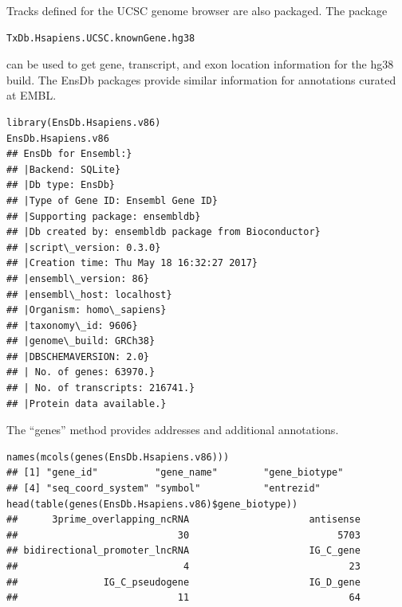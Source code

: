 Tracks defined for the UCSC genome browser are also
packaged. The package 
\begin{verbatim}
TxDb.Hsapiens.UCSC.knownGene.hg38 
\end{verbatim} 
can be
used to get gene, transcript, and exon location information
for the hg38 build. The EnsDb packages provide similar
information for annotations curated at EMBL.


\begin{shaded}
\begin{verbatim}
library(EnsDb.Hsapiens.v86)
EnsDb.Hsapiens.v86
## EnsDb for Ensembl:}
## |Backend: SQLite}
## |Db type: EnsDb}
## |Type of Gene ID: Ensembl Gene ID}
## |Supporting package: ensembldb}
## |Db created by: ensembldb package from Bioconductor}
## |script\_version: 0.3.0}
## |Creation time: Thu May 18 16:32:27 2017}
## |ensembl\_version: 86}
## |ensembl\_host: localhost}
## |Organism: homo\_sapiens}
## |taxonomy\_id: 9606}
## |genome\_build: GRCh38}
## |DBSCHEMAVERSION: 2.0}
## | No. of genes: 63970.}
## | No. of transcripts: 216741.}
## |Protein data available.}
\end{verbatim}
\end{shaded}


The ``genes'' method provides addresses and additional
annotations.

\begin{shaded}
\begin{verbatim}
names(mcols(genes(EnsDb.Hsapiens.v86)))
## [1] "gene_id"          "gene_name"        "gene_biotype"     
## [4] "seq_coord_system" "symbol"           "entrezid"
head(table(genes(EnsDb.Hsapiens.v86)$gene_biotype))
##      3prime_overlapping_ncRNA                     antisense 
##                            30                          5703 
## bidirectional_promoter_lncRNA                     IG_C_gene 
##                             4                            23 
##               IG_C_pseudogene                     IG_D_gene 
##                            11                            64
\end{verbatim}
\end{shaded}

